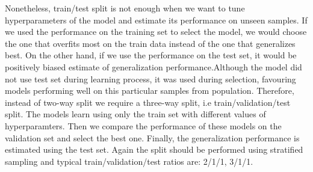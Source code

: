 \documentclass[shortabstract, english, mgr]{iithesis}
\begin{document}
Nonetheless, train/test split is not enough when we want to tune hyperparameters of the model and estimate its performance on unseen samples. If we used the performance on the training set to select the model, we would choose the one that overfits most on the train data instead of the one that generalizes best. On the other hand, if we use the performance on the test set, it would be positively biased estimate of generalization performance.Although the model did not use test set during learning process, it was used during selection, favouring models performing well on this particular samples from population. Therefore, instead of two-way split we require a three-way split, i.e train/validation/test split. The models learn using only the train set with different values of hyperparamters. Then we compare the performance of these models on the validation set and select the best one. Finally, the generalization performance is estimated using the test set. Again the split should be performed using stratified sampling and typical train/validation/test ratios are: 2/1/1, 3/1/1.
\end{document}
